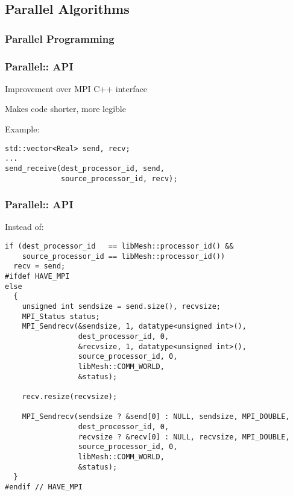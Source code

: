 \subsection{Parallel Algorithms}
\subsubsection{Parallel Programming}
\begin{frame}[fragile]
\frametitle{Parallel:: API}
\item Improvement over MPI C++ interface
\item Makes code shorter, more legible
\royitemizeend

Example:
\small
\begin{lstlisting}
std::vector<Real> send, recv;
...
send_receive(dest_processor_id, send,
             source_processor_id, recv);
\end{lstlisting}
\end{frame}



\begin{frame}
\frametitle{Parallel:: API}

Instead of:
\begin{lstlisting}
if (dest_processor_id   == libMesh::processor_id() &&
    source_processor_id == libMesh::processor_id())
  recv = send;
#ifdef HAVE_MPI
else
  {
    unsigned int sendsize = send.size(), recvsize;
    MPI_Status status;
    MPI_Sendrecv(&sendsize, 1, datatype<unsigned int>(),
                 dest_processor_id, 0,
                 &recvsize, 1, datatype<unsigned int>(),
                 source_processor_id, 0,
                 libMesh::COMM_WORLD,
                 &status);

    recv.resize(recvsize);

    MPI_Sendrecv(sendsize ? &send[0] : NULL, sendsize, MPI_DOUBLE,
                 dest_processor_id, 0,
                 recvsize ? &recv[0] : NULL, recvsize, MPI_DOUBLE,
                 source_processor_id, 0,
                 libMesh::COMM_WORLD,
                 &status);
  }
#endif // HAVE_MPI
\end{lstlisting}
\end{frame}


